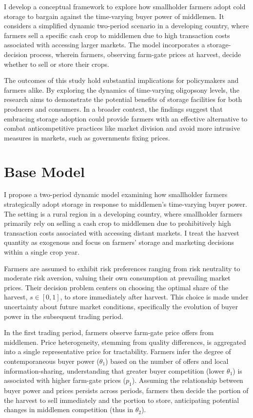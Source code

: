 I develop a conceptual framework to explore how smallholder farmers adopt cold storage to bargain against the time-varying buyer power of middlemen. It considers a simplified dynamic two-period scenario in a developing country, where farmers sell a specific cash crop to middlemen due to high transaction costs associated with accessing larger markets. The model incorporates a storage-decision process, wherein farmers, observing farm-gate prices at harvest, decide whether to sell or store their crops.

The outcomes of this study hold substantial implications for policymakers and farmers alike. By exploring the dynamics of time-varying oligopsony levels, the research aims to demonstrate the potential benefits of storage facilities for both producers and consumers. In a broader context, the findings suggest that embracing storage adoption could provide farmers with an effective alternative to combat anticompetitive practices like market division and avoid more intrusive measures in markets, such as governments fixing prices.





\section{Base Model}
\noindent  I propose a two-period dynamic model examining how smallholder farmers strategically adopt storage in response to middlemen's time-varying buyer power. The setting is a rural region in a developing country, where smallholder farmers primarily rely on selling a cash crop to middlemen due to prohibitively high transaction costs associated with accessing distant markets. I treat the harvest quantity as exogenous and focus on farmers' storage and marketing decisions within a single crop year.

Farmers are assumed to exhibit risk preferences ranging from risk neutrality to moderate risk aversion, valuing their own consumption at prevailing market prices. Their decision problem centers on choosing the optimal share of the harvest, $s \in [0,1]$, to store immediately after harvest. This choice is made under uncertainty about future market conditions, specifically the evolution of buyer power in the subsequent trading period.

In the first trading period, farmers observe farm-gate price offers from middlemen. Price heterogeneity, stemming from quality differences, is aggregated into a single representative price for tractability. Farmers infer the degree of contemporaneous buyer power ($\theta_1$) based on the number of offers and local information-sharing, understanding that greater buyer competition (lower $\theta_1$) is associated with higher farm-gate prices ($p_1$). Assuming the relationship between buyer power and prices persists across periods, farmers then decide the portion of the harvest to sell immediately and the portion to store, anticipating potential changes in middlemen competition (thus in $\theta_2$).  

